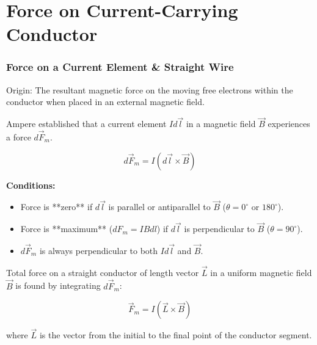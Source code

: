 \section{Force on Current-Carrying Conductor}

\transfade[duration=0.5]

\begin{frame}[t]
    \frametitle{\textcolor{deepnavy}{\textbf{Force on a Current Element & Straight Wire}}}
    \renewcommand{\familydefault}{\rmdefault}
    \small

      \item<+-> Origin: The resultant magnetic force on the moving free electrons within the conductor when placed in an external magnetic field.
      \item<+-> Ampere established that a current element $I d\vec{l}$ in a magnetic field $\vec{B}$ experiences a force $d\vec{F}_m$.
        \begin{tcolorbox}[colback=orange!8,colframe=accentorange,boxrule=0.5pt,arc=1mm,boxsep=2pt]
        \begin{equation*}
             d\vec{F}_m = I (d\vec{l} \times \vec{B})
        \end{equation*}
          \end{tcolorbox}

    \item<+-> \textbf{Conditions:}
        \begin{itemize}[<+->]
              \item Force is **zero** if $d\vec{l}$ is parallel or antiparallel to $\vec{B}$ ($\theta = 0^\circ$ or $180^\circ$).
              \item Force is **maximum** ($dF_m = I B dl$) if $d\vec{l}$ is perpendicular to $\vec{B}$ ($\theta = 90^\circ$).
              \item $d\vec{F}_m$ is always perpendicular to both $I d\vec{l}$ and $\vec{B}$.
        \end{itemize}

      \item<+-> Total force on a straight conductor of length vector $\vec{L}$ in a uniform magnetic field $\vec{B}$ is found by integrating $d\vec{F}_m$:
        \begin{tcolorbox}[colback=blue!5,colframe=blue!80,boxrule=0.5pt,arc=1mm,boxsep=1pt]
        \begin{equation*}
             \vec{F}_m = I (\vec{L} \times \vec{B})
        \end{equation*}
        \end{tcolorbox}
          where $\vec{L}$ is the vector from the initial to the final point of the conductor segment.
\end{frame}


